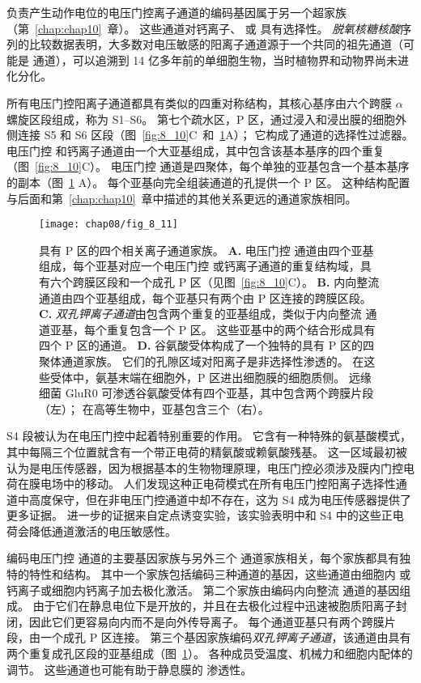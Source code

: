 负责产生动作电位的电压门控离子通道的编码基因属于另一个超家族（第~\ref{chap:chap10}~章）。
这些通道对钙离子、 或  具有选择性。
\textit{脱氧核糖核酸}序列的比较数据表明，大多数对电压敏感的阳离子通道源于一个共同的祖先通道（可能是  通道），可以追溯到 14 亿多年前的单细胞生物，当时植物界和动物界尚未进化分化。


所有电压门控阳离子通道都具有类似的四重对称结构，其核心基序由六个跨膜 $\alpha$ 螺旋区段组成，称为 S1–S6。
第七个疏水区，P 区，通过浸入和浸出膜的细胞外侧连接 S5 和 S6 区段（图~\ref{fig:8_10}C~和~\ref{fig:8_11}A）；
它构成了通道的选择性过滤器。
电压门控  和钙离子通道由一个大亚基组成，其中包含该基本基序的四个重复（图~\ref{fig:8_10}C）。 
电压门控  通道是四聚体，每个单独的亚基包含一个基本基序的副本（图~\ref{fig:8_11} A）。
每个亚基向完全组装通道的孔提供一个 P 区。
这种结构配置与后面和第~\ref{chap:chap10}~章中描述的其他关系更远的通道家族相同。


\begin{figure}[htbp]
	\centering
	\texttt{[image: chap08/fig\_8\_11]}
	\caption{具有 P 区的四个相关离子通道家族。
		\textbf{A.} 电压门控  通道由四个亚基组成，每个亚基对应一个电压门控  或钙离子通道的重复结构域，具有六个跨膜区段和一个成孔 P 区（见图~\ref{fig:8_10}C）。
		\textbf{B.} 内向整流  通道由四个亚基组成，每个亚基只有两个由 P 区连接的跨膜区段。
		\textbf{C.} \textit{双孔钾离子通道}由包含两个重复的亚基组成，类似于内向整流  通道亚基，每个重复包含一个 P 区。
		这些亚基中的两个结合形成具有四个 P 区的通道。
		\textbf{D.} 谷氨酸受体构成了一个独特的具有 P 区的四聚体通道家族。
		它们的孔隙区域对阳离子是非选择性渗透的。
		在这些受体中，氨基末端在细胞外，P 区进出细胞膜的细胞质侧。
		远缘细菌 GluR0  可渗透谷氨酸受体有四个亚基，其中包含两个跨膜片段（左）；
		在高等生物中，亚基包含三个（右）。}
	\label{fig:8_11}
\end{figure}


S4 段被认为在电压门控中起着特别重要的作用。
它含有一种特殊的氨基酸模式，其中每隔三个位置就含有一个带正电荷的精氨酸或赖氨酸残基。
这一区域最初被认为是电压传感器，因为根据基本的生物物理原理，电压门控必须涉及膜内门控电荷在膜电场中的移动。
人们发现这种正电荷模式在所有电压门控阳离子选择性通道中高度保守，但在非电压门控通道中却不存在，这为 S4 成为电压传感器提供了更多证据。
进一步的证据来自定点诱变实验，该实验表明中和 S4 中的这些正电荷会降低通道激活的电压敏感性。


编码电压门控  通道的主要基因家族与另外三个  通道家族相关，每个家族都具有独特的特性和结构。
其中一个家族包括编码三种通道的基因，这些通道由细胞内  或钙离子或细胞内钙离子加去极化激活。
第二个家族由编码内向整流  通道的基因组成。
由于它们在静息电位下是开放的，并且在去极化过程中迅速被胞质阳离子封闭，因此它们更容易向内而不是向外传导离子。
每个通道亚基只有两个跨膜片段，由一个成孔 P 区连接。
第三个基因家族编码\textit{双孔钾离子通道}，该通道由具有两个重复成孔区段的亚基组成（图~\ref{fig:8_11}）。
各种成员受温度、机械力和细胞内配体的调节。
这些通道也可能有助于静息膜的  渗透性。


